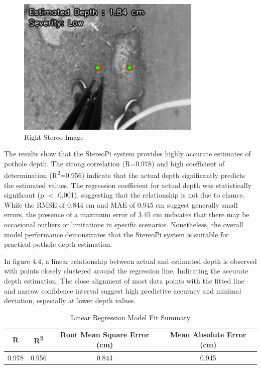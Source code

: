 \begin{figure}[htbp]
\begin{minipage}{0.32\textwidth}
		\includegraphics[width=\textwidth]{pothole raw right.png}
		\caption{Right Stereo Image}
		\label{fig:image3}
	\end{minipage}
\end{figure}


The results show that the StereoPi system provides highly accurate estimates of pothole depth. The strong correlation (R=0.978) and high coefficient of determination (R\textsuperscript{2}=0.956) indicate that the actual depth significantly predicts the estimated values. The regression coefficient for actual depth was statistically significant (p $<$ 0.001), suggesting that the relationship is not due to chance. While the RMSE of 0.844 cm and MAE of 0.945 cm suggest generally small errors, the presence of a maximum error of 3.45 cm indicates that there may be occasional outliers or limitations in specific scenarios. Nonetheless, the overall model performance demonstrates that the StereoPi system is suitable for practical pothole depth estimation.

In figure 4.4, a linear relationship between actual and estimated depth is observed with points closely clustered around the regression line. Indicating the accurate depth estimation. The close alignment of most data points with the fitted line and narrow confidence interval suggest high predictive accuracy and minimal deviation, especially at lower depth values.



\begin{table}[H]
	\centering
	\begin{tabular}{|c|c|c|c|}
		\hline
		\textbf{R} & \textbf{R\textsuperscript{2}} & \textbf{Root Mean Square Error (cm)} & \textbf{Mean Absolute Error (cm)} \\
		\hline
		0.978 & 0.956 & 0.844 & 0.945 \\
		\hline
	\end{tabular}
	\caption{Linear Regression Model Fit Summary}
	\label{tab:model_fit}
\end{table}

